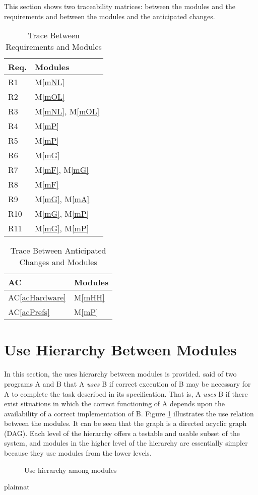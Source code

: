 \documentclass[12pt, titlepage]{article}
\newcommand{\acref}[1]{AC\ref{#1}}
\newcommand{\mref}[1]{M\ref{#1}}
\begin{document}
This section shows two traceability matrices: between the modules and the
requirements and between the modules and the anticipated changes.

\begin{table}[H]
\centering
\begin{tabular}{p{} p{}}
\toprule
\textbf{Req.} & \textbf{Modules}\\
\midrule
R1 & \mref{mNL}\\
R2 & \mref{mOL}\\
R3 & \mref{mNL}, \mref{mOL}\\
R4 & \mref{mP}\\
R5 & \mref{mP}\\
R6 & \mref{mG}\\
R7 & \mref{mF}, \mref{mG}\\
R8 & \mref{mF}\\
R9 & \mref{mG}, \mref{mA}\\
R10 & \mref{mG}, \mref{mP}\\
R11 & \mref{mG}, \mref{mP}\\
\bottomrule
\end{tabular}
\caption{Trace Between Requirements and Modules}
\label{TblRT}
\end{table}

\begin{table}[H]
\centering
\begin{tabular}{p{} p{}}
\toprule
\textbf{AC} & \textbf{Modules}\\
\midrule
\acref{acHardware} & \mref{mHH}\\
\acref{acPrefs} & \mref{mP}\\
\bottomrule
\end{tabular}
\caption{Trace Between Anticipated Changes and Modules}
\label{TblACT}
\end{table}

\section{Use Hierarchy Between Modules} \label{SecUse}

In this section, the uses hierarchy between modules is
provided. \citet{Parnas1978} said of two programs A and B that A {\em uses} B if
correct execution of B may be necessary for A to complete the task described in
its specification. That is, A {\em uses} B if there exist situations in which
the correct functioning of A depends upon the availability of a correct
implementation of B.  Figure \ref{FigUH} illustrates the use relation between
the modules. It can be seen that the graph is a directed acyclic graph
(DAG). Each level of the hierarchy offers a testable and usable subset of the
system, and modules in the higher level of the hierarchy are essentially simpler
because they use modules from the lower levels.

\begin{figure}[H]
\centering
\caption{Use hierarchy among modules}
\label{FigUH}
\end{figure}

\newpage


 {plainnat}

\end{document}
